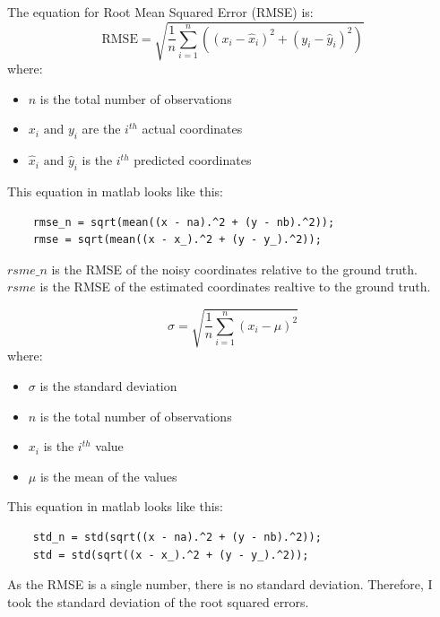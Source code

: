 \documentclass[conference]{IEEEtran}
\begin{document}
        The equation for Root Mean Squared Error (RMSE) is:
        \begin{equation}
            \text{RMSE} = \sqrt{\frac{1}{n}\sum_{i=1}^{n}{({(x_i - \hat{x}_i)}^2 + {(y_i - \hat{y}_i)}^2)}}
        \end{equation}
        where:
        \begin{itemize}
            \item $n$ is the total number of observations
            \item $x_i \text{ and } y_i$ are the $i^{th}$ actual coordinates
            \item $\hat{x}_i \text{ and } \hat{y}_i$ is the $i^{th}$ predicted coordinates
        \end{itemize}
        This equation in matlab looks like this:
        \scriptsize
        \begin{lstlisting}[style=Matlab-editor, basicstyle=\scriptsize]
    % Root Mean Squared Error (RMSE) calculation
    rmse_n = sqrt(mean((x - na).^2 + (y - nb).^2));
    rmse = sqrt(mean((x - x_).^2 + (y - y_).^2));
        \end{lstlisting}
        \normalsize
        $rsme\_n$ is the RMSE of the noisy coordinates relative to the ground truth.\\
        $rsme$ is the RMSE of the estimated coordinates realtive to the ground truth.


        \begin{equation}
            \sigma = \sqrt{\frac{1}{n}\sum_{i=1}^{n}{(x_i - \mu)}^2}
        \end{equation}    
        where:
        \begin{itemize}
            \item $\sigma$ is the standard deviation
            \item $n$ is the total number of observations
            \item $x_i$ is the $i^{th}$ value
            \item $\mu$ is the mean of the values
        \end{itemize}        
        This equation in matlab looks like this:
        \begin{lstlisting}[style=Matlab-editor, basicstyle=\scriptsize]
    % Standard deviation calculation of the RMSE
    std_n = std(sqrt((x - na).^2 + (y - nb).^2));
    std = std(sqrt((x - x_).^2 + (y - y_).^2));
        \end{lstlisting}
        \normalsize
        As the RMSE is a single number, there is no standard deviation. Therefore, I took the standard deviation of the root squared errors.
\end{document}
